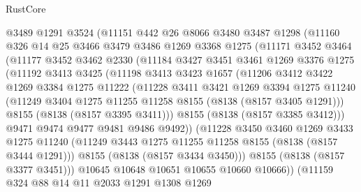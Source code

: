 \begin{lexlean}{RustCore}
\begin{coremodule}
          @3489
          @1291
          @3524
          (@11151
            @442
            @26
            @8066
            @3480
            @3487
            @1298
            (@11160
              @326
              @14
              @25
              @3466
              @3479
              @3486
              @1269
              @3368
              @1275
              (@11171
                @3452
                @3464
                (@11177
                  @3452
                  @3462
                  @2330
                  (@11184
                    @3427
                    @3451
                    @3461
                    @1269
                    @3376
                    @1275
                    (@11192
                      @3413
                      @3425
                      (@11198
                        @3413
                        @3423
                        @1657
                        (@11206
                          @3412
                          @3422
                          @1269
                          @3384
                          @1275
                          @11222
                          (@11228
                            @3411
                            @3421
                            @1269
                            @3394
                            @1275
                            @11240
                            (@11249 @3404 @1275 @11255 @11258 @8155 (@8138 (@8157 @3405 @1291)))
                            @8155
                            (@8138 (@8157 @3395 @3411)))
                          @8155
                          (@8138 (@8157 @3385 @3412)))
                        @9471
                        @9474
                        @9477
                        @9481
                        @9486
                        @9492))
                    (@11228
                      @3450
                      @3460
                      @1269
                      @3433
                      @1275
                      @11240
                      (@11249 @3443 @1275 @11255 @11258 @8155 (@8138 (@8157 @3444 @1291)))
                      @8155
                      (@8138 (@8157 @3434 @3450)))
                    @8155
                    (@8138 (@8157 @3377 @3451)))
                  @10645
                  @10648
                  @10651
                  @10655
                  @10660
                  @10666))
              (@11159
                @324
                @88
                @14
                @11
                @2033
                @1291
                @1308
                @1269

\end{coremodule}
\end{lexlean}
